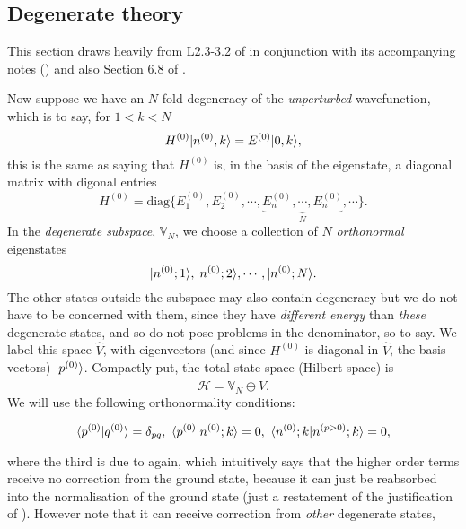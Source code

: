 \subsection{Degenerate theory}
This section draws heavily from L2.3-3.2 of \cite{bartonyt} in conjunction with 
its accompanying notes (\cite{barton}) and also Section 6.8 of \cite{atkinsqm}.\par
Now suppose we have an $N$-fold degeneracy of the \textit{unperturbed} 
wavefunction, which is to say, for $1<k<N$
\begin{equation}
H^{(0)}|n^{(0)},k\rangle=E^{(0)}|0,k\rangle, 
\end{equation}
this is the same as saying that $H^{(0)}$ is, in the basis of the eigenstate, 
a diagonal matrix with digonal entries
\begin{equation}
H^{(0)}=\text{diag}\{E_1^{(0)},E_2^{(0)},\cdots,\underbrace{E_n^{(0)},\cdots,E_n^{(0)}}_{N},\cdots \}.
\end{equation}
In the \textit{degenerate subspace}, $\mathbb{V}_N$, we choose a collection of 
$N$ \textit{orthonormal} eigenstates
\begin{equation}
|n^{(0)};1\rangle,|n^{(0)};2\rangle,\cdots,|n^{(0)};N\rangle.
\end{equation}
The other states outside the subspace may also contain degeneracy but we do not 
have to be concerned with them, since they have \textit{different energy} than 
\textit{these} degenerate states, and so do not pose problems in the denominator, 
so to say. We label this space $\hat{V}$, with eigenvectors (and since $H^{(0)}$ 
is diagonal in $\hat{V}$, the basis vectors) $|p^{(0)}\rangle $. 
Compactly put, the total state space (Hilbert space) is
\begin{equation}
\mathcal{H}=\mathbb{V}_N\oplus\hat{V}.
\end{equation}
We will use the following orthonormality conditions: 
\begin{prt}
\label{dptorth}
\begin{equation}
\langle p^{(0)} |q^{(0)} \rangle=\delta_{pq},\ \langle p^{(0)} |n^{(0)};k \rangle=0,\ \langle n^{(0)};k |n^{(p>0)};k \rangle=0,
\end{equation}
\end{prt}
where the third is due to  again, which intuitively says that the 
higher order terms receive no correction from the ground state, because it can 
just be reabsorbed into the normalisation of the ground state (just a restatement 
of the justification of ). 
However note that it can receive correction from \textit{other} degenerate states, 

